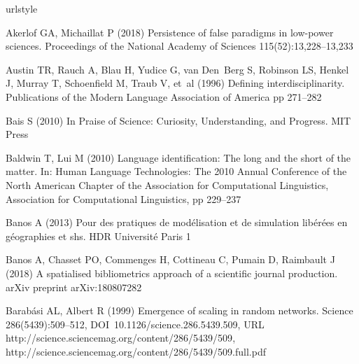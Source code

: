 \begin{thebibliography}{84}
\providecommand{\natexlab}[1]{#1}
\providecommand{\url}[1]{{#1}}
\providecommand{\urlprefix}{URL }
\expandafter\ifx\csname urlstyle\endcsname\relax
  \providecommand{\doi}[1]{DOI~\discretionary{}{}{}#1}\else
  \providecommand{\doi}{DOI~\discretionary{}{}{}\begingroup
  \urlstyle{rm}\Url}\fi
\providecommand{\eprint}[2][]{\url{#2}}

Akerlof GA, Michaillat P (2018) Persistence of false paradigms in low-power
  sciences. Proceedings of the National Academy of Sciences
  115(52):13,228--13,233

Austin TR, Rauch A, Blau H, Yudice G, van Den~Berg S, Robinson LS, Henkel J,
  Murray T, Schoenfield M, Traub V, et~al (1996) Defining interdisciplinarity.
  Publications of the Modern Language Association of America pp 271--282

Bais S (2010) In Praise of Science: Curiosity, Understanding, and Progress. MIT
  Press

Baldwin T, Lui M (2010) Language identification: The long and the short of the
  matter. In: Human Language Technologies: The 2010 Annual Conference of the
  North American Chapter of the Association for Computational Linguistics,
  Association for Computational Linguistics, pp 229--237

Banos A (2013) Pour des pratiques de mod{\'e}lisation et de simulation
  lib{\'e}r{\'e}es en g{\'e}ographies et shs. HDR Universit{\'e} Paris 1

Banos A, Chasset PO, Commenges H, Cottineau C, Pumain D, Raimbault J (2018) A
  spatialised bibliometrics approach of a scientific journal production. arXiv
  preprint arXiv:180807282

Barab{\'a}si AL, Albert R (1999) Emergence of scaling in random networks.
  Science 286(5439):509--512, \doi{10.1126/science.286.5439.509},
  \urlprefix\url{http://science.sciencemag.org/content/286/5439/509},
  \eprint{http://science.sciencemag.org/content/286/5439/509.full.pdf}


\end{thebibliography}

